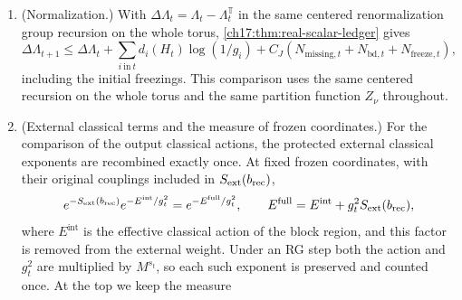 \begin{theorem}
\begin{enumerate}
\[
\begin{split}
 p_t(C_t(c,\zeta;\Rec),\Rec)\le{}&
 A_tZ_\nu^{-1}e^{\Lambda_t(\Rec)}W_t(\Rec)\\
 &\times\exp\{-E_t(\Log C_t(c,\zeta;\Rec);\Rec)/g_{\ell_t}^2\}\\
 &\times\exp\{-R_t(\Log C_t(c,\zeta;\Rec);\Rec)\}.
\end{split}
\]
Here $A_0=1$ and
\[
 A_{t+1}=A_t(1-\epsilon_t)^{-1},\qquad
 \epsilon_t\le6\mathsf b_t e^{-p(t_t)^2/48},\quad
 \mathsf b_t\le C_Jm_t^3,
 \qquad \log A_T\le C_\delta,
\]
after the uniform choice of the minimal side in \cref{ch17:lem:ambient-white-comparison}. Every step uses the exact Haar disintegration and then a single triangular change to normalized fluctuation variables, with determinant
\[
 \prod_{i=0}^{s_t-1}g_i^{3f_i}
          \det K_i(c_{i+1}(w_{>i});\Rec)^{-1/2}.
\]
The resulting Borel set of fluctuation coordinates of supported points is contained in the enclosing product domain, and \cref{ch18:lem:enclosure-comparison}, with identical prefactors and the smaller cutoff domain, gives the stated loss. The next stage evaluates the same configuration. The indicators are kept until this comparison, and no domination at arbitrary points of the enclosing product domain is required.
\item (Normalization.) With $\Delta\Lambda_t=\Lambda_t-\Lambda_t^{\mathbb T}$ in the same centered renormalization group recursion on the whole torus, \cref{ch17:thm:real-scalar-ledger} gives
\[
 \Delta\Lambda_{t+1}\le\Delta\Lambda_t+
       \sum_{i\ \mathrm{in}\ t}d_i(H_t)\log(1/g_i)
       +C_J(N_{\mathrm{missing},t}+N_{\mathrm{bd},t}
                                      +N_{\mathrm{freeze},t}),
\]
including the initial freezings. This comparison uses the same centered recursion on the whole torus and the same partition function $Z_\nu$ throughout.
\item (External classical terms and the measure of frozen coordinates.) For the comparison of the output classical actions, the protected external classical exponents are recombined exactly once. At fixed frozen coordinates, with their original couplings included in $S_{\mathrm{ext}}(b_{\mathrm{rec}})$,
\[
 e^{-S_{\mathrm{ext}}(b_{\mathrm{rec}})}e^{-E^{\mathrm{int}}/g_t^2}
      =e^{-E^{\mathrm{full}}/g_t^2},\qquad
 E^{\mathrm{full}}=E^{\mathrm{int}}+g_t^2S_{\mathrm{ext}}(b_{\mathrm{rec}}),
\]
where $E^{\mathrm{int}}$ is the effective classical action of the block region, and this factor is removed from the external weight. Under an RG step both the action and $g_t^2$ are multiplied by $M^{s_t}$, so each such exponent is preserved and counted once. At the top we keep the measure

\end{enumerate}
\end{theorem}
